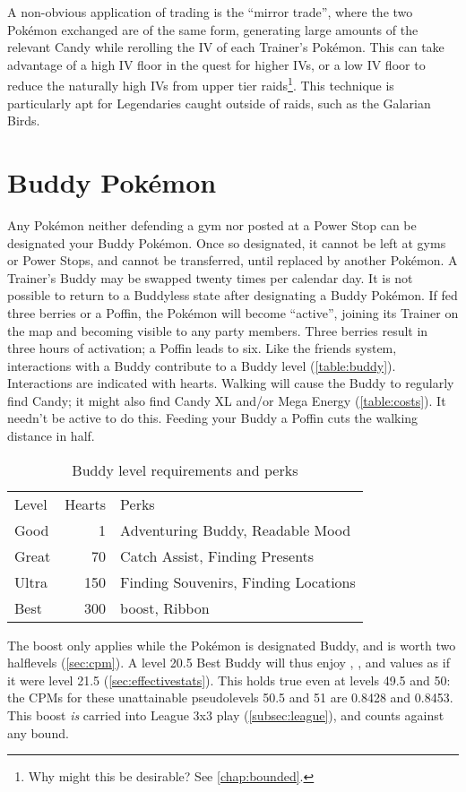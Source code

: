 A non-obvious application of trading is the ``mirror trade'', where the
 two Pokémon exchanged are of the same form, generating large amounts
 of the relevant Candy while rerolling the IV of each Trainer's Pokémon.
This can take advantage of a high IV floor in the quest for higher IVs, or
 a low IV floor to reduce the naturally high IVs from upper tier raids\footnote{Why might this be desirable? See \autoref{chap:bounded}.}.
This technique is particularly apt for Legendaries caught outside of raids,
 such as the Galarian Birds.

\section{Buddy Pokémon\label{sec:buddies}}
Any Pokémon neither defending a gym nor posted at a Power Stop can be designated your Buddy Pokémon.
Once so designated, it cannot be left at gyms or Power Stops, and cannot be transferred,
  until replaced by another Pokémon.
A Trainer's Buddy may be swapped twenty times per calendar day.
It is not possible to return to a Buddyless state after designating a Buddy Pokémon.
If fed three berries or a Poffin, the Pokémon will become ``active'',
  joining its Trainer on the map and becoming visible to any party members.
Three berries result in three hours of activation; a Poffin leads to six.
Like the friends system, interactions with a Buddy contribute to a Buddy level (\autoref{table:buddy}).
Interactions are indicated with hearts.
Walking will cause the Buddy to regularly find Candy; it might also find Candy XL
  and/or Mega Energy (\autoref{table:costs}).
It needn't be active to do this.
Feeding your Buddy a Poffin cuts the walking distance in half.
\begin{table}
\centering
\begin{tabular}{lrl}
Level & Hearts & Perks\\
\Midrule
Good & 1 & Adventuring Buddy, Readable Mood\\
Great & 70 & Catch Assist, Finding Presents\\
Ultra & 150 & Finding Souvenirs, Finding Locations\\
Best & 300 & \CPM{} boost, Ribbon\\
\end{tabular}
\caption{Buddy level requirements and perks\label{table:buddy}}
\end{table}
The \CPM{} boost only applies while the Pokémon is designated Buddy,
  and is worth two halflevels (\autoref{sec:cpm}).
A level 20.5 Best Buddy will thus enjoy , , and  values
  as if it were level 21.5 (\autoref{sec:effectivestats}).
This holds true even at levels 49.5 and 50: the CPMs for these unattainable
  pseudolevels 50.5 and 51 are 0.8428 and 0.8453.
This boost \textit{is} carried into League 3x3 play (\autoref{subsec:league}),
  and counts against any \CP{} bound.

